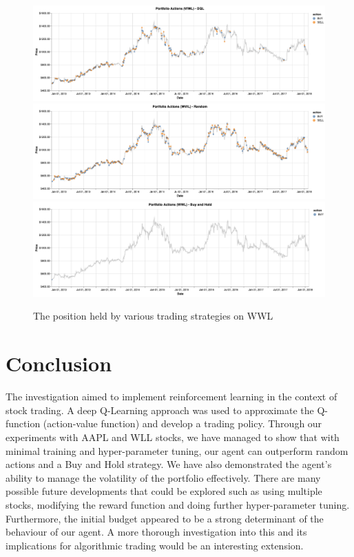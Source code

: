 \documentclass[12pt, authoryear]{elsarticle}
\begin{document}
\begin{figure}[H]
  \begin{center} 
  	\caption{The position held by various trading strategies on WWL}
  	\label{my-label}
	\includegraphics[scale=0.42]{figures/wwl_action_dql.png} \\
	\includegraphics[scale=0.42]{figures/wwl_action_rand.png} \\
	\includegraphics[scale=0.42]{figures/wwl_action_bh.png} \\
	\label{fig:wwlaction}
\end{center} 
\end{figure}

\section{Conclusion}

The investigation aimed to implement reinforcement learning in the context of stock trading. A deep Q-Learning approach was used to approximate the Q-function (action-value function) and develop a trading policy. Through our experiments with AAPL and WLL stocks, we have managed to show that with minimal training and hyper-parameter tuning, our agent can outperform random actions and a Buy and Hold strategy. We have also demonstrated the agent's ability to manage the volatility of the portfolio effectively. There are many possible future developments that could be explored such as using multiple stocks, modifying the reward function and doing further hyper-parameter tuning. Furthermore, the initial budget appeared to be a strong determinant of the behaviour of our agent. A more thorough investigation into this and its implications for algorithmic trading would be an interesting extension.
\end{document}
